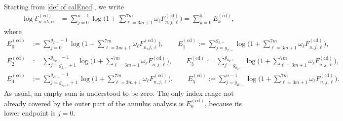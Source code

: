 \documentclass[a4paper]{article}
\numberwithin{equation}{section}
\begin{document}
Starting from \eqref{def of calEncd}, we write
\begin{align*}
\log \mathcal{E}_{n,s\lambda,\alpha}^{(\mathrm{cd})}&=
\sum_{j=0}^{n-1}\log\Big( 
1+\sum_{\ell=3m+1}^{7m}\omega_{\ell}F_{n,j,\ell}^{(\mathrm{cd})}
\Bigr)
=\sum_{k=0}^{5}E_k^{(\mathrm{cd})},
\end{align*}
where
\begin{align*}
E_0^{(\mathrm{cd})}&:=\sum_{j=0}^{g_{2,-}-1}\log\Big( 
1+\sum_{\ell=3m+1}^{7m}\omega_{\ell}F_{n,j,\ell}^{(\mathrm{cd})}
\Bigr), \qquad
E_1^{(\mathrm{cd})}:=\sum_{j=g_{2,-}}^{g_{2,+}}\log\Big( 
1+\sum_{\ell=3m+1}^{7m}\omega_{\ell}F_{n,j,\ell}^{(\mathrm{cd})}
\Bigr),  \\   
E_2^{(\mathrm{cd})}&:=\sum_{j=g_{2,+}+1}^{g_{a_2,-}-1}\log\Big( 
1+\sum_{\ell=3m+1}^{7m}\omega_{\ell}F_{n,j,\ell}^{(\mathrm{cd})}
\Bigr), \qquad
E_3^{(\mathrm{cd})}:=\sum_{j=g_{a_2,-}}^{g_{a_2,+}}\log\Big( 
1+\sum_{\ell=3m+1}^{7m}\omega_{\ell}F_{n,j,\ell}^{(\mathrm{cd})}
\Bigr),
\\
E_4^{(\mathrm{cd})}&:=\sum_{j=g_{a_2,+}+1}^{g_{R,-}-1}\log\Big( 
1+\sum_{\ell=3m+1}^{7m}\omega_{\ell}F_{n,j,\ell}^{(\mathrm{cd})}
\Bigr), \qquad
E_5^{(\mathrm{cd})}:=\sum_{j=g_{R,-}}^{n-1}\log\Big( 
1+\sum_{\ell=3m+1}^{7m}\omega_{\ell}F_{n,j,\ell}^{(\mathrm{cd})}
\Bigr). 
\end{align*}
As usual, an empty sum is understood to be zero.  The only index range not
already covered by the outer part of the annulus analysis is
$E_0^{(\mathrm{cd})}$, because its lower endpoint is $j=0$.
\end{document}
